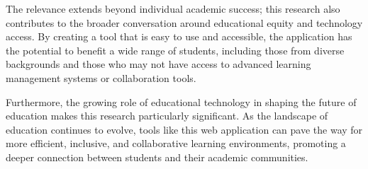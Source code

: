 The relevance extends beyond individual academic success; this research also contributes to the broader conversation around educational equity and technology access. By creating a tool that is easy to use and accessible, the application has the potential to benefit a wide range of students, including those from diverse backgrounds and those who may not have access to advanced learning management systems or collaboration tools.

Furthermore, the growing role of educational technology in shaping the future of education makes this research particularly significant. As the landscape of education continues to evolve, tools like this web application can pave the way for more efficient, inclusive, and collaborative learning environments, promoting a deeper connection between students and their academic communities.